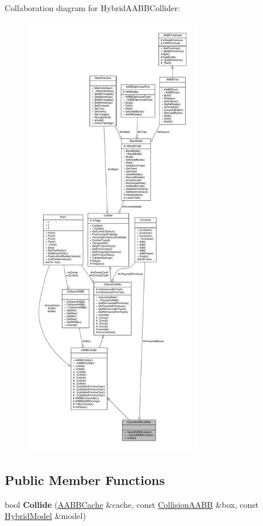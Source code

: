 Collaboration diagram for Hybrid\+A\+A\+B\+B\+Collider\+:
\nopagebreak
\begin{figure}[H]
\begin{center}
\leavevmode
\includegraphics[height=550pt]{d0/d88/classHybridAABBCollider__coll__graph}
\end{center}
\end{figure}
\subsection*{Public Member Functions}
\begin{DoxyCompactItemize}
\item 
bool {\bfseries Collide} (\hyperlink{structAABBCache}{A\+A\+B\+B\+Cache} \&cache, const \hyperlink{classCollisionAABB}{Collision\+A\+A\+BB} \&box, const \hyperlink{classHybridModel}{Hybrid\+Model} \&model)\hypertarget{classHybridAABBCollider_a166977ef6944a03cb4c1b3633e54216a}{}\label{classHybridAABBCollider_a166977ef6944a03cb4c1b3633e54216a}

\end{DoxyCompactItemize}
